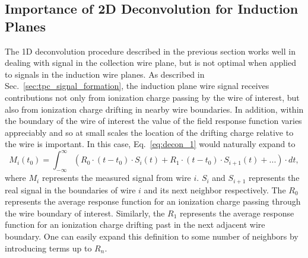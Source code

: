 \subsection{Importance of 2D Deconvolution for Induction Planes}
The 1D deconvolution procedure described in the previous section 
works well in dealing with signal in the collection wire plane, but is not 
optimal when applied to signals in the induction wire planes. 
As described in Sec.~\ref{sec:tpc_signal_formation}, the induction plane wire 
signal receives contributions not only from ionization charge 
passing by the wire of interest, but also from ionization charge drifting in 
nearby wire boundaries. In addition, within the boundary of the wire of 
interest the value of the field response function varies appreciably 
and so at small scales the location of the drifting charge relative to the wire 
is important. In this case, Eq.~\ref{eq:decon_1} would naturally expand to 
\begin{equation}\label{eq:decon_2d_1}
M_i(t_0) = \int_{-\infty}^{\infty} \left( R_0 \cdot (t-t_0) \cdot S_i(t) + 
R_1 \cdot (t-t_0) \cdot S_{i+1} (t) + ...\right) \cdot dt,
\end{equation}
where $M_i$ represents the measured signal from wire $i$.  $S_i$ and
$S_{i+1}$ represents the real signal in the boundaries of wire $i$ and
its next neighbor respectively.
The $R_0$ represents the average response function for an ionization
charge passing through the wire boundary of interest.
Similarly, the $R_1$ represents the average response function for an
ionization charge drifting past in the next adjacent wire boundary. One can
easily expand this definition to some number of neighbors by introducing terms up 
to $R_n$.

